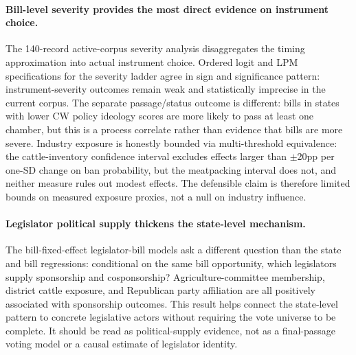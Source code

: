 \documentclass[12pt]{article}
\begin{document}
\paragraph{Bill-level severity provides the most direct evidence on instrument choice.}  The 140-record active-corpus severity analysis disaggregates the timing approximation into actual instrument choice.  Ordered logit and LPM specifications for the severity ladder agree in sign and significance pattern: instrument-severity outcomes remain weak and statistically imprecise in the current corpus.  The separate passage/status outcome is different: bills in states with lower CW policy ideology scores are more likely to pass at least one chamber, but this is a process correlate rather than evidence that bills are more severe.  Industry exposure is honestly bounded via multi-threshold equivalence: the cattle-inventory confidence interval excludes effects larger than $\pm$20pp per one-SD change on ban probability, but the meatpacking interval does not, and neither measure rules out modest effects.  The defensible claim is therefore limited bounds on measured exposure proxies, not a null on industry influence.

\paragraph{Legislator political supply thickens the state-level mechanism.}  The bill-fixed-effect legislator-bill models ask a different question than the state and bill regressions: conditional on the same bill opportunity, which legislators supply sponsorship and cosponsorship?  Agriculture-committee membership, district cattle exposure, and Republican party affiliation are all positively associated with sponsorship outcomes.  This result helps connect the state-level pattern to concrete legislative actors without requiring the vote universe to be complete.  It should be read as political-supply evidence, not as a final-passage voting model or a causal estimate of legislator identity.
\end{document}
